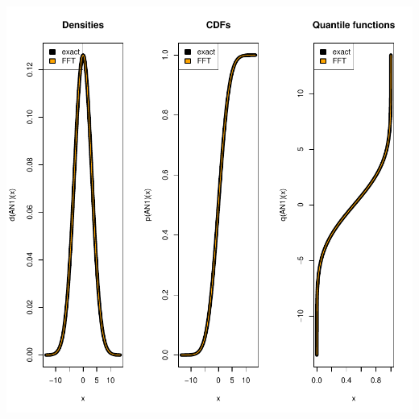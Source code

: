 \documentclass[11pt]{article}
\begin{document}
\includegraphics{distr-nFoldConvolution}
\end{document}
